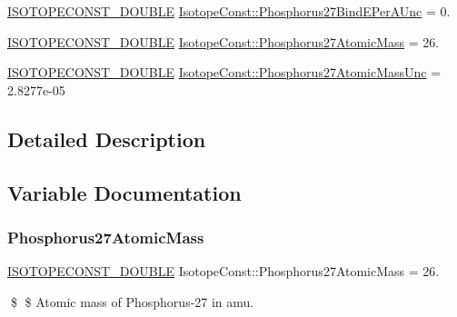 \begin{DoxyCompactItemize}
\mbox{\hyperlink{group___isotope_const-_macros_ga8f45a7272ce02c0b4c65c44636ed719a}{I\+S\+O\+T\+O\+P\+E\+C\+O\+N\+S\+T\+\_\+\+D\+O\+U\+B\+LE}} \mbox{\hyperlink{group___isotope_const-_phosphorus-_p27_ga99c9603c1d4d71764f1339c8f8766e17}{Isotope\+Const\+::\+Phosphorus27\+Bind\+E\+Per\+A\+Unc}} = 0.
\item 
\mbox{\hyperlink{group___isotope_const-_macros_ga8f45a7272ce02c0b4c65c44636ed719a}{I\+S\+O\+T\+O\+P\+E\+C\+O\+N\+S\+T\+\_\+\+D\+O\+U\+B\+LE}} \mbox{\hyperlink{group___isotope_const-_phosphorus-_p27_gaec8d9750b772983b6353c8546edb1c4e}{Isotope\+Const\+::\+Phosphorus27\+Atomic\+Mass}} = 26.
\item 
\mbox{\hyperlink{group___isotope_const-_macros_ga8f45a7272ce02c0b4c65c44636ed719a}{I\+S\+O\+T\+O\+P\+E\+C\+O\+N\+S\+T\+\_\+\+D\+O\+U\+B\+LE}} \mbox{\hyperlink{group___isotope_const-_phosphorus-_p27_gacf56713460b193107a88446d1cb4522b}{Isotope\+Const\+::\+Phosphorus27\+Atomic\+Mass\+Unc}} = 2.\+8277e-\/05
\end{DoxyCompactItemize}


\subsection{Detailed Description}


\subsection{Variable Documentation}
\mbox{\label{group___isotope_const-_phosphorus-_p27_gaec8d9750b772983b6353c8546edb1c4e}} 
\subsubsection{\texorpdfstring{Phosphorus27\+Atomic\+Mass}{Phosphorus27AtomicMass}}
{\footnotesize\ttfamily \mbox{\hyperlink{group___isotope_const-_macros_ga8f45a7272ce02c0b4c65c44636ed719a}{I\+S\+O\+T\+O\+P\+E\+C\+O\+N\+S\+T\+\_\+\+D\+O\+U\+B\+LE}} Isotope\+Const\+::\+Phosphorus27\+Atomic\+Mass = 26.}

\$ \$ Atomic mass of Phosphorus-\/27 in amu. \mbox{\label{group___isotope_const-_phosphorus-_p27_gacf56713460b193107a88446d1cb4522b}} 

